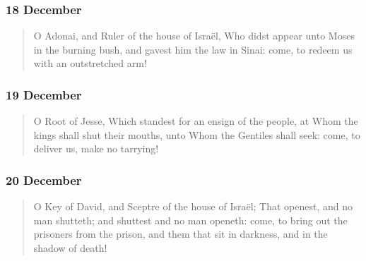 \subsubsection*{18 December}

\begin{quote}
\par
\end{quote}

\begin{quote}
O Adonai, and Ruler of the house of Israël, Who didst appear unto Moses in the burning bush, and gavest him the law in Sinai: come, to redeem us with an outstretched arm!\par
\end{quote}

\subsubsection*{19 December}

\begin{quote}
\par
\end{quote}

\begin{quote}
O Root of Jesse, Which standest for an ensign of the people, at Whom the kings shall shut their mouths, unto Whom the Gentiles shall seek: come, to deliver us, make no tarrying!\par
\end{quote}

\subsubsection*{20 December}

\begin{quote}
\par
\end{quote}

\begin{quote}
O Key of David, and Sceptre of the house of Israël; That openest, and no man shutteth; and shuttest and no man openeth: come, to bring out the prisoners from the prison, and them that sit in darkness, and in the shadow of death!\par
\end{quote}

